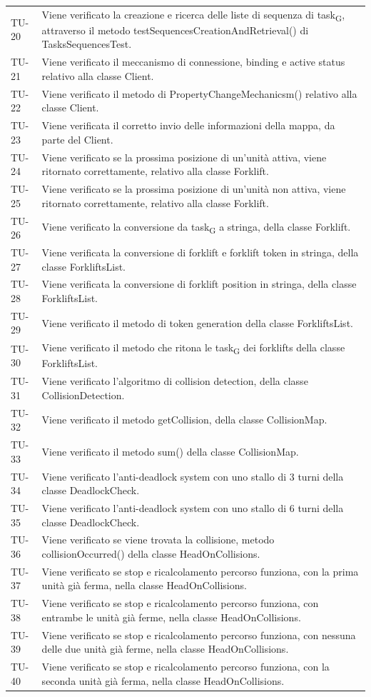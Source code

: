 \begin{longtable}{ >{\centering}p{} >{}p{}}
	TU-20 & Viene verificato la creazione e ricerca delle liste di sequenza di task\textsubscript{G}, attraverso il metodo testSequencesCreationAndRetrieval() di TasksSequencesTest. \tabularnewline
	TU-21 & Viene verificato il meccanismo di connessione, binding e active status relativo alla classe Client. \tabularnewline
	TU-22 & Viene verificato il metodo di PropertyChangeMechanicsm() relativo alla classe Client. \tabularnewline
	TU-23 & Viene verificata il corretto invio delle informazioni della mappa, da parte del Client. \tabularnewline
	TU-24 & Viene verificato se la prossima posizione di un'unità attiva, viene ritornato correttamente, relativo alla classe Forklift. \tabularnewline
	TU-25 & Viene verificato se la prossima posizione di un'unità non attiva, viene ritornato correttamente, relativo alla classe Forklift. \tabularnewline
	TU-26 & Viene verificato la conversione da task\textsubscript{G} a stringa, della classe Forklift. \tabularnewline
	TU-27 & Viene verificata la conversione di forklift e forklift token in stringa, della classe ForkliftsList. \tabularnewline
	TU-28 & Viene verificata la conversione di forklift position in stringa, della classe ForkliftsList. \tabularnewline
	TU-29 & Viene verificato il metodo di token generation della classe ForkliftsList. \tabularnewline
	TU-30 & Viene verificato il metodo che ritona le task\textsubscript{G} dei forklifts della classe ForkliftsList. \tabularnewline
	TU-31 & Viene verificato l'algoritmo di collision detection, della classe CollisionDetection. \tabularnewline
	TU-32 & Viene verificato il metodo getCollision, della classe CollisionMap. \tabularnewline
	TU-33 & Viene verificato il metodo sum() della classe CollisionMap. \tabularnewline
	TU-34 & Viene verificato l'anti-deadlock system con uno stallo di 3 turni della classe DeadlockCheck. \tabularnewline
	TU-35 & Viene verificato l'anti-deadlock system con uno stallo di 6 turni della classe DeadlockCheck. \tabularnewline
	TU-36 & Viene verificato se viene trovata la collisione, metodo collisionOccurred() della classe HeadOnCollisions. \tabularnewline
	TU-37 & Viene verificato se stop e ricalcolamento percorso funziona, con la prima unità già ferma, nella classe HeadOnCollisions. \tabularnewline
	TU-38 & Viene verificato se stop e ricalcolamento percorso funziona, con entrambe le unità già ferme, nella classe HeadOnCollisions. \tabularnewline
	TU-39 & Viene verificato se stop e ricalcolamento percorso funziona, con nessuna delle due unità già ferme, nella classe HeadOnCollisions. \tabularnewline
	TU-40 & Viene verificato se stop e ricalcolamento percorso funziona, con la seconda unità già ferma, nella classe HeadOnCollisions. \tabularnewline

\end{longtable}
